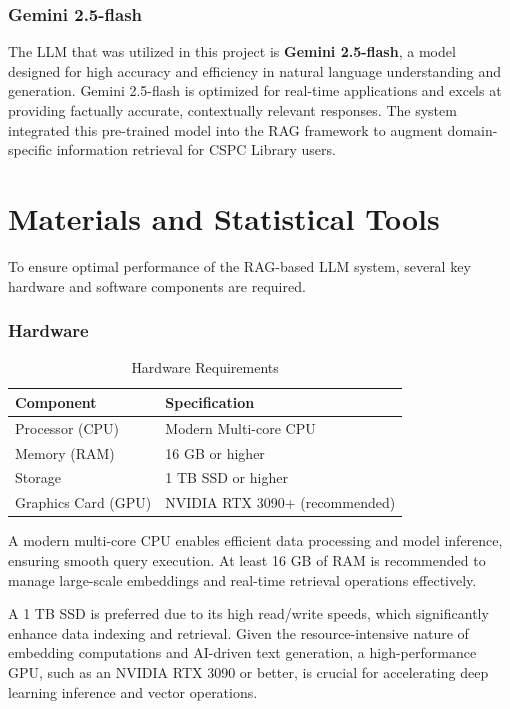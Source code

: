 \begin{refsection}
\subsubsection*{Gemini 2.5-flash}

The LLM that was utilized in this project is \textbf{Gemini 2.5-flash}, a model designed for high accuracy and efficiency in natural language understanding and generation. Gemini 2.5-flash is optimized for real-time applications and excels at providing factually accurate, contextually relevant responses. The system integrated this pre-trained model into the RAG framework to augment domain-specific information retrieval for CSPC Library users.

\section{Materials and Statistical Tools}

To ensure optimal performance of the RAG-based LLM system, several key hardware and software components are required.

\subsubsection*{Hardware}
\begin{table}[H]
    \centering
    \caption{Hardware Requirements}
    \label{tab:hardware_requirements}
    \begin{tabular}{ll}
        \hline
        \textbf{Component}       & \textbf{Specification}                     \\ \hline
        Processor (CPU)          & Modern Multi-core CPU                      \\
        Memory (RAM)             & 16 GB or higher                            \\
        Storage                  & 1 TB SSD or higher                         \\
        Graphics Card (GPU)      & NVIDIA RTX 3090+ (recommended)             \\
        \hline
    \end{tabular}
\end{table}

A modern multi-core CPU enables efficient data processing and model inference, ensuring smooth query execution. At least 16 GB of RAM is recommended to manage large-scale embeddings and real-time retrieval operations effectively. 

A 1 TB SSD is preferred due to its high read/write speeds, which significantly enhance data indexing and retrieval. Given the resource-intensive nature of embedding computations and AI-driven text generation, a high-performance GPU, such as an NVIDIA RTX 3090 or better, is crucial for accelerating deep learning inference and vector operations.



\end{refsection}

